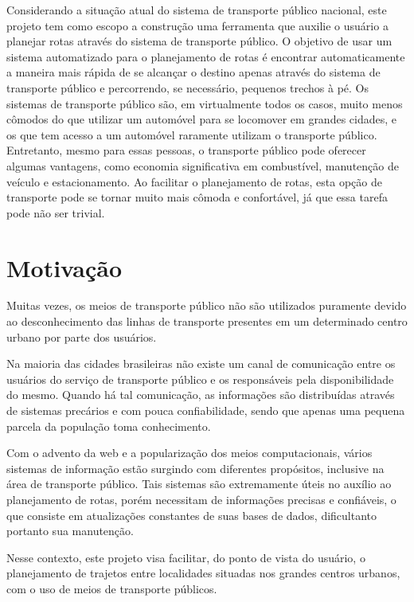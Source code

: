 Considerando a situação atual do sistema de transporte público nacional, este projeto tem como escopo a construção uma ferramenta que auxilie o usuário a planejar rotas através do sistema de transporte público.
O objetivo de usar um sistema automatizado para o planejamento de rotas é encontrar automaticamente a maneira mais rápida de se alcançar o destino apenas através do sistema de transporte público e percorrendo, se necessário, pequenos trechos à pé.
Os sistemas de transporte público são, em virtualmente todos os casos, muito menos cômodos do que utilizar um automóvel para se locomover em grandes cidades, e os que tem acesso a um automóvel raramente utilizam o transporte público. Entretanto, mesmo para essas pessoas, o transporte público pode oferecer algumas vantagens, como economia significativa em combustível, manutenção de veículo e estacionamento. Ao facilitar o planejamento de rotas, esta opção de transporte pode se tornar muito mais cômoda e confortável, já que essa tarefa pode não ser trivial.

\section{Motivação}

Muitas vezes, os meios de transporte público não são utilizados puramente devido ao desconhecimento das linhas de transporte presentes em um determinado centro urbano por parte dos usuários. 

Na maioria das cidades brasileiras não existe um canal de comunicação entre os usuários do serviço de transporte público e os responsáveis pela disponibilidade do mesmo. Quando há tal comunicação, as informações são distribuídas através de sistemas precários e com pouca confiabilidade, sendo que apenas uma pequena parcela da população toma conhecimento.

Com o advento da web e a popularização dos meios computacionais, vários sistemas de informação estão surgindo com diferentes propósitos, inclusive na área de transporte público. Tais sistemas são extremamente úteis no auxílio ao planejamento de rotas, porém necessitam de informações precisas e confiáveis, o que consiste em atualizações constantes de suas bases de dados, dificultanto portanto sua manutenção.

Nesse contexto, este projeto visa facilitar, do ponto de vista do usuário, o planejamento de trajetos entre localidades situadas nos grandes centros urbanos, com o uso de meios de transporte públicos.

